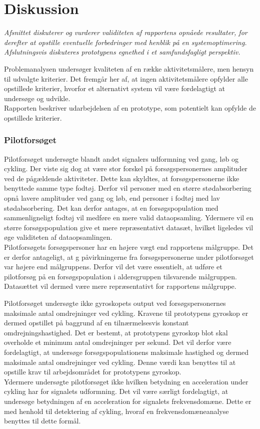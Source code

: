 \section{Diskussion}\label{sec:diskussion}
\textit{Afsnittet diskuterer og vurderer validiteten af rapportens opnåede resultater, for derefter at opstille eventuelle forbedringer med henblik på en systemoptimering. Afslutningsvis diskuteres prototypens egnethed i et samfundsfagligt perspektiv.}

Problemanalysen undersøger kvaliteten af en række aktivitetsmålere, men hensyn til udvalgte kriterier. Det fremgår her af, at ingen aktivitetsmålere opfylder alle opstillede kriterier, hvorfor et alternativt system vil være fordelagtigt at undersøge og udvikle. \\
Rapporten beskriver udarbejdelsen af en prototype, som potentielt kan opfylde de opstillede kriterier. 

\subsubsection{Pilotforsøget}
Pilotforsøget undersøgte blandt andet signalers udformning ved gang, løb og cykling. Der viste sig dog at være stor forskel på forsøgspersonernes amplituder ved de pågældende aktiviteter. Dette kan skyldtes, at forsøgspersonerne ikke benyttede samme type fodtøj. Derfor vil personer med en større stødabsorbering opnå lavere amplituder ved gang og løb, end personer i fodtøj med lav stødabsorbering. Det kan derfor antages, at en forsøgspopulation med sammenligneligt fodtøj vil medføre en mere valid dataopsamling.
Ydermere vil en større forsøgspopulation give et mere repræsentativt datasæt, hvilket ligeledes vil øge validiteten af dataopsamlingen. \\
Pilotforsøgets forsøgspersoner har en højere vægt end rapportens målgruppe. Det er derfor antageligt, at g påvirkningerne fra forsøgspersonerne under pilotforsøget var højere end målgruppens. Derfor vil det være essentielt, at udføre et pilotforsøg på en forsøgspopulation i aldersgruppen tilsvarende målgruppen. Datasættet vil dermed være mere repræsentativt for rapportens målgruppe.

Pilotforsøget undersøgte ikke gyroskopets output ved forsøgspersonernes maksimale antal omdrejninger ved cykling. Kravene til prototypens gyroskop er dermed opstillet på baggrund af en tilnærmelsesvis konstant omdrejningshastighed. Det er bestemt, at prototypens gyroskop blot skal overholde et minimum antal omdrejninger per sekund. Det vil derfor være fordelagtigt, at undersøge forsøgspopulationens maksimale hastighed og dermed maksimale antal omdrejninger ved cykling. Denne værdi kan benyttes til at opstille krav til arbejdsområdet for prototypens gyroskop. \\
Ydermere undersøgte pilotforsøget ikke hvilken betydning en acceleration under cykling har for signalets udformning. Det vil være særligt fordelagtigt, at undersøge betydningen af en acceleration for signalets frekvensdomæne. Dette er med henhold til detektering af cykling, hvoraf en frekvensdomæneanalyse benyttes til dette formål.

